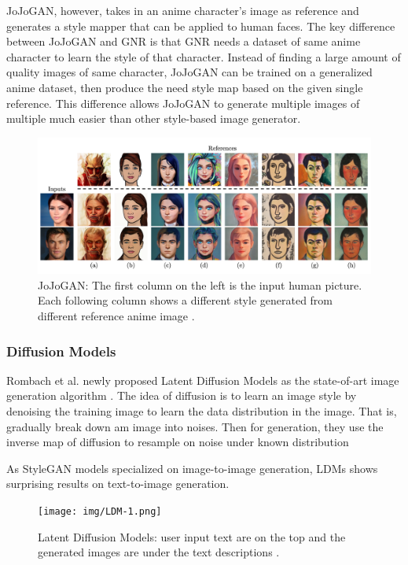 JoJoGAN, however, takes in an anime character's image as reference and generates
a style mapper that can be applied to human faces.
The key difference between JoJoGAN and GNR is that GNR needs a dataset of same anime character to learn the style of that character.
Instead of finding a large amount of quality images of same character,
JoJoGAN can be trained on a generalized anime dataset,
then produce the need style map based on the given single reference.
This difference allows JoJoGAN to generate multiple images of multiple much easier than other style-based image generator.
\begin{figure}[h]
    \includegraphics[width=\textwidth]{img/JoJo-1.png}
    \caption{
        JoJoGAN: The first column on the left is the input human picture.
        Each following column shows a different style generated from different reference anime image \cite{chong2021jojogan}.
    }
\end{figure}

\subsubsection*{Diffusion Models}

Rombach et al. newly proposed Latent Diffusion Models as the state-of-art image generation algorithm \cite{Rombach2022High}.
The idea of diffusion is to learn an image style by denoising the training image to learn the data distribution in the image.
That is, gradually break down am image into noises.
Then for generation, they use the inverse map of diffusion to resample on noise under known distribution


As StyleGAN models specialized on image-to-image generation,
LDMs shows surprising results on text-to-image generation.
\begin{figure}[h]
    \texttt{[image: img/LDM-1.png]}
    \caption{
        Latent Diffusion Models:
        user input text are on the top
        and the generated images are under the text descriptions \cite{Rombach2022High}.
    }
\end{figure}

